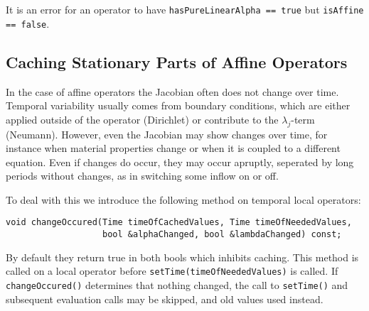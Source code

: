 \documentclass[11pt,a4paper,DIV11,%
notitlepage,oneside,abstracton,%
bibtotoc]{scrartcl}
\begin{document}
It is an error for an operator to have {\tt hasPureLinearAlpha == true} but
{\tt isAffine == false}.

\subsection{Caching Stationary Parts of Affine Operators}

In the case of affine operators the Jacobian often does not change over time.
Temporal variability usually comes from boundary conditions, which are either
applied outside of the operator (Dirichlet) or contribute to the
$\lambda_j$-term (Neumann).  However, even the Jacobian may show changes over
time, for instance when material properties change or when it is coupled to a
different equation.  Even if changes do occur, they may occur apruptly,
seperated by long periods without changes, as in switching some inflow on or
off.

To deal with this we introduce the following method on temporal local
operators:
\begin{lstlisting}
void changeOccured(Time timeOfCachedValues, Time timeOfNeededValues,
                   bool &alphaChanged, bool &lambdaChanged) const;
\end{lstlisting}
By default they return true in both bools which inhibits caching.  This method
is called on a local operator before {\tt setTime(timeOfNeededValues)} is
called.  If {\tt changeOccured()} determines that nothing changed, the call to
{\tt setTime()} and subsequent evaluation calls may be skipped, and old values
used instead.
\end{document}
